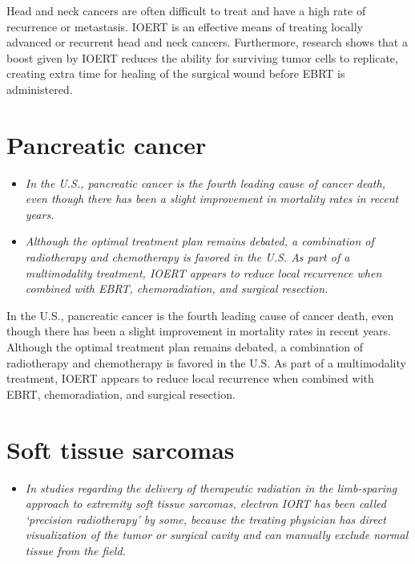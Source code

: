 Head and neck cancers are often difficult to treat and have a high rate
of recurrence or metastasis. IOERT is an effective means of treating
locally advanced or recurrent head and neck cancers. Furthermore,
research shows that a boost given by IOERT reduces the ability for
surviving tumor cells to replicate, creating extra time for healing of
the surgical wound before EBRT is administered.

\section{Pancreatic cancer}\label{pancreatic-cancer}

\begin{itemize}
\item
  \emph{In the U.S., pancreatic cancer is the fourth leading cause of
  cancer death, even though there has been a slight improvement in
  mortality rates in recent years.}
\item
  \emph{Although the optimal treatment plan remains debated, a
  combination of radiotherapy and chemotherapy is favored in the U.S. As
  part of a multimodality treatment, IOERT appears to reduce local
  recurrence when combined with EBRT, chemoradiation, and surgical
  resection.}
\end{itemize}

In the U.S., pancreatic cancer is the fourth leading cause of cancer
death, even though there has been a slight improvement in mortality
rates in recent years. Although the optimal treatment plan remains
debated, a combination of radiotherapy and chemotherapy is favored in
the U.S. As part of a multimodality treatment, IOERT appears to reduce
local recurrence when combined with EBRT, chemoradiation, and surgical
resection.

\section{Soft tissue sarcomas}\label{soft-tissue-sarcomas}

\begin{itemize}
\item
  \emph{In studies regarding the delivery of therapeutic radiation in
  the limb-sparing approach to extremity soft tissue sarcomas, electron
  IORT has been called `precision radiotherapy' by some, because the
  treating physician has direct visualization of the tumor or surgical
  cavity and can manually exclude normal tissue from the field.}
\end{itemize}

